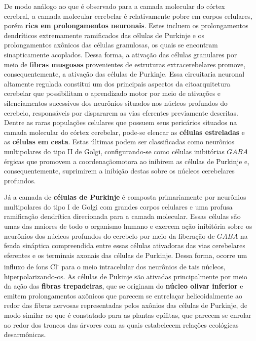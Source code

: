 \documentclass[
]{book}
\begin{document}
De modo análogo ao que é observado para a camada molecular do córtex cerebral, a camada molecular cerebelar é relativamente pobre em corpos celulares, porém \textbf{rica em prolongamentos neuronais}. Estes incluem os prolongamentos dendríticos extremamente ramificados das células de Purkinje e os prolongamentos axônicos das células granulosas, os quais se encontram sinapticamente acoplados. Dessa forma, a ativação das células granulares por meio de \textbf{fibras musgosas} provenientes de estruturas extracerebelares promove, consequentemente, a ativação das células de Purkinje. Essa circuitaria neuronal altamente regulada constitui um dos principais aspectos da citoarquitetura cerebelar que possibilitam o aprendizado motor por meio de ativações e silenciamentos sucessivos dos neurônios situados nos núcleos profundos do cerebelo, responsáveis por dispararem as vias eferentes previamente descritas. Dentre as raras populações celulares que possuem seus pericários situados na camada molecular do córtex cerebelar, pode-se elencar as \textbf{células estreladas} e as \textbf{células em cesta}. Estas últimas podem ser classificadas como neurônios multipolares do tipo II de Golgi, configurando-se como células inibitórias \(GABA\)érgicas que promovem a coordenaçãomotora ao inibirem as células de Purkinje e, consequentemente, suprimirem a inibição destas sobre os núcleos cerebelares profundos.

Já a camada de \textbf{células de Purkinje} é composta primariamente por neurônios multipolares do tipo I de Golgi com grandes corpos celulares e uma profusa ramificação dendrítica direcionada para a camada molecular. Essas células são umas das maiores de todo o organismo humano e exercem ação inibitória sobre os neurônios dos núcleos profundos do cerebelo por meio da liberação de \(GABA\) na fenda sináptica compreendida entre essas células ativadoras das vias cerebelares eferentes e os terminais axonais das células de Purkinje. Dessa forma, ocorre um influxo de íons Cl\textsuperscript{-} para o meio intracelular dos neurônios de tais núcleos, hiperpolarizando-os. As células de Pukinje são ativadas principalmente por meio da ação das \textbf{fibras trepadeiras}, que se originam do \textbf{núcleo olivar inferior} e emitem prolongamentos axônicos que parecem se entrelaçar helicoidalmente ao redor das fibras nervosas representadas pelos axônios das células de Purkinje, de modo similar ao que é constatado para as plantas epífitas, que parecem se enrolar ao redor dos troncos das árvores com as quais estabelecem relações ecológicas desarmônicas.
\end{document}
